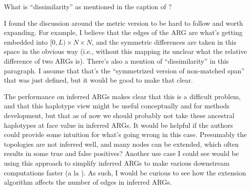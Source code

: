 
\begin{point}{}
 What is ``dissimilarity'' as mentioned in the caption of ?
\end{point}


\begin{point}{\revref}
 I found the discussion around the metric version to be hard to follow and worth expanding.
For example, I believe that the edges of the ARG are what's getting embedded into
$[0, L) \times N \times N$, and the symmetric differences are taken in this space in the obvious way (i.e., without this mapping its unclear what the relative difference of two ARGs is).
There's also a mention of ``dissimilarity'' in this paragraph. I assume that that's the ``symmetrized version of non-matched span'' that was just defined, but it would be good to make that clear. 
\end{point}


\begin{point}{}
 The performance on inferred ARGs makes clear that this is a difficult problem, and that this haplotype view might be useful conceptually and for methods development, but that as of now we should probably not take these ancestral haplotypes at face value in inferred ARGs. It would be helpful if the authors could provide some intuition for what's going wrong in this case. Presumably the topologies are not inferred well, and many nodes can be extended, which often results in some true and false positives? Another use case I could see would be using this approach to simplify inferred ARGs to make various downstream computations faster (a la ). As such, I would be curious to see how the extension algorithm affects the number of edges in inferred ARGs.
\end{point}

